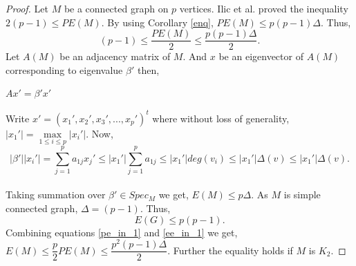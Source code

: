 \documentclass{article}
\newtheorem*{open problem*}{Open Problem}
\begin{document}
	\begin{proof}
		Let $M$ be a connected graph on $p$ vertices. Ilic et al. \cite{Aleksandar Ilic} proved the inequality $2(p-1) \leq PE(M).$ By using Corollary \ref{enq}, $PE(M) \leq p(p-1) \Delta.$ Thus,
		\begin{equation}\label{pe_in_1}
			(p-1) \leq \dfrac{PE(M)}{2} \leq \dfrac{p(p-1)\Delta}{2}.
		\end{equation}
		Let $A(M)$ be an adjacency matrix of $M.$
		And $x$ be an eigenvector of $A(M)$ corresponding to eigenvalue $\beta'$ then,
		\begin{center}
			$Ax'=\beta' x'$
		\end{center}
		Write $x'=(x_1', x_2',x_3',...,x_p')^t$ where without loss of generality, $|x_1'|=\underset{ 1\leq i \leq p}\max|x_i'|.$ Now, 
		\begin{equation}
			|\beta'||x_i'|=\sum_{j=1}^{p} a_{1j}x_j' 
			\leq |x_1'|\sum_{j=1}^{p} a_{1j}
			\leq |x_1'| deg(v_i)	
			\leq |x_1'|  \Delta(v)
			\leq |x_1'| \Delta(v). 
		\end{equation} \\
		Taking summation over $\beta' \in Spec_M$ we get,	$E(M)\leq p\Delta.$ As $M$ is simple connected graph, $\Delta = (p-1).$ Thus,
		\begin{equation}\label{ee_in_1}
			E(G)\leq p(p-1).
		\end{equation}
		Combining equations \ref{pe_in_1} and \ref{ee_in_1} we get, $E(M) \leq \dfrac{p}{2} PE(M) \leq \dfrac{p^2(p-1)\Delta}{2}.$ 
		Further the equality holds if $M$ is $K_2.$
	\end{proof}
\end{document}
